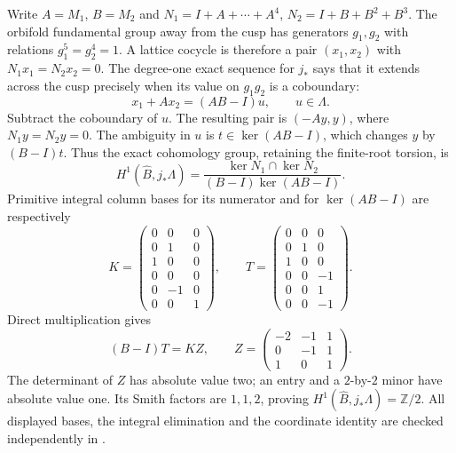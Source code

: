 \item Write $A=M_1$, $B=M_2$ and
$N_1=I+A+\cdots+A^4$, $N_2=I+B+B^2+B^3$.
The orbifold fundamental group away from the cusp has generators
$g_1,g_2$ with relations $g_1^5=g_2^4=1$.  A lattice cocycle is
therefore a pair $(x_1,x_2)$ with $N_1x_1=N_2x_2=0$.
The degree-one exact sequence for $j_*$ says that it extends across
the cusp precisely when its value on $g_1g_2$ is a coboundary:
\[
x_1+Ax_2=(AB-I)u,\qquad u\in\Lambda.
\]
Subtract the coboundary of $u$.  The resulting pair is $(-Ay,y)$,
where $N_1y=N_2y=0$.  The ambiguity in $u$ is
$t\in\ker(AB-I)$, which changes $y$ by $(B-I)t$.
Thus the exact cohomology group, retaining the finite-root torsion, is
\[
H^1(\widehat B,j_*\Lambda)=
\frac{\ker N_1\cap\ker N_2}{(B-I)\ker(AB-I)}.
\]
Primitive integral column bases for its numerator and for
$\ker(AB-I)$ are respectively
\[
K=\begin{pmatrix}
0&0&0\\0&1&0\\1&0&0\\0&0&0\\0&-1&0\\0&0&1
\end{pmatrix},\qquad
T=\begin{pmatrix}
0&0&0\\0&1&0\\1&0&0\\0&0&-1\\0&0&1\\0&0&-1
\end{pmatrix}.
\]
Direct multiplication gives
\[
(B-I)T=KZ,\qquad
Z=\begin{pmatrix}-2&-1&1\\0&-1&1\\1&0&1\end{pmatrix}.
\]
The determinant of $Z$ has absolute value two; an entry and a
$2$-by-$2$ minor have absolute value one.  Its Smith factors are
$1,1,2$, proving $H^1(\widehat B,j_*\Lambda)=\mathbb Z/2$.
All displayed bases, the integral elimination and the coordinate
identity are checked independently in
.
